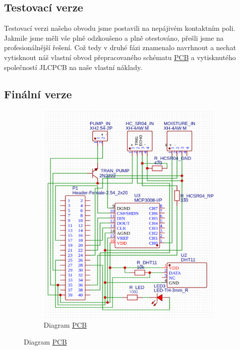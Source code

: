 \documentclass[12pt,a4paper]{article}
\begin{document}
\subsection{Testovací verze}

Testovací verzi našeho obvodu jsme postavili na nepájivém kontaktním poli. Jakmile jsme měli vše plně odzkoušeno a plně otestováno, přešli jsme na profesionálnější řešení. Což tedy v druhé fázi znamenalo navrhnout a nechat vytisknout náš vlastní obvod přepracovaného schématu \underline{\ac{PCB}} a vytisknutého společností JLCPCB na naše vlastní náklady.

\subsection{Finální verze}

\begin{figure}[h]
	\centering
	\begin{subfigure}[b]{0.4\linewidth}
		\includegraphics[width=\linewidth]{pcb.png}
		\caption{Diagram \underline{\ac{PCB}}}
	\end{subfigure}

\end{figure}
\end{document}
